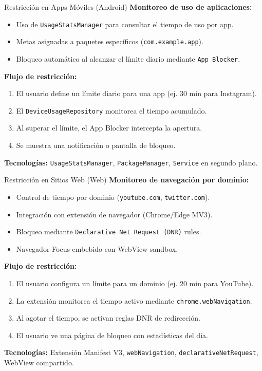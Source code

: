 \documentclass[aspectratio=169]{beamer}
\begin{document}
\begin{frame}{Restricción en Apps Móviles (Android)}
  \textbf{Monitoreo de uso de aplicaciones:}
  \begin{itemize}
    \item Uso de \texttt{UsageStatsManager} para consultar el tiempo de uso por app.
    \item Metas asignadas a paquetes específicos (\texttt{com.example.app}).
    \item Bloqueo automático al alcanzar el límite diario mediante \texttt{App Blocker}.
  \end{itemize}

  \vspace{0.2cm}
  \textbf{Flujo de restricción:}
  \begin{enumerate}
    \item El usuario define un límite diario para una app (ej. 30 min para Instagram).
    \item El \texttt{DeviceUsageRepository} monitorea el tiempo acumulado.
    \item Al superar el límite, el App Blocker intercepta la apertura.
    \item Se muestra una notificación o pantalla de bloqueo.
  \end{enumerate}

  \vspace{0.2cm}
  \textbf{Tecnologías:} \texttt{UsageStatsManager}, \texttt{PackageManager},
  \texttt{Service} en segundo plano.
\end{frame}

\begin{frame}{Restricción en Sitios Web (Web)}
  \textbf{Monitoreo de navegación por dominio:}
  \begin{itemize}
    \item Control de tiempo por dominio (\texttt{youtube.com}, \texttt{twitter.com}).
    \item Integración con extensión de navegador (Chrome/Edge MV3).
    \item Bloqueo mediante \texttt{Declarative Net Request (DNR)} rules.
    \item Navegador Focus embebido con WebView sandbox.
  \end{itemize}

  \vspace{0.2cm}
  \textbf{Flujo de restricción:}
  \begin{enumerate}
    \item El usuario configura un límite para un dominio (ej. 20 min para YouTube).
    \item La extensión monitorea el tiempo activo mediante \texttt{chrome.webNavigation}.
    \item Al agotar el tiempo, se activan reglas DNR de redirección.
    \item El usuario ve una página de bloqueo con estadísticas del día.
  \end{enumerate}

  \vspace{0.2cm}
  \textbf{Tecnologías:} Extensión Manifest V3, \texttt{webNavigation},
  \texttt{declarativeNetRequest}, WebView compartido.
\end{frame}
\end{document}
